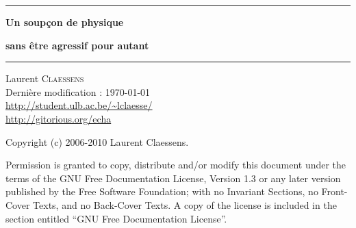 
\thispagestyle{empty}
\begin{center}
  \begin{minipage}{15cm}
    \hrule\par
    \vspace{2mm}
    \begin{center}
    \Huge \bfseries Un soupçon de physique  \par
    \Huge \bfseries sans être agressif pour autant \par
    \end{center}
    \hrule\par
  \end{minipage}
\end{center}

\vfill\vfill
\null\hfill Laurent \textsc{Claessens}\\
\null\hfill Dernière modification : \today\\
\null\hfill \url{http://student.ulb.ac.be/~lclaesse/}\\
\null\hfill \url{http://gitorious.org/echa}

\newpage

Copyright (c) 2006-2010  Laurent Claessens.

Permission is granted to copy, distribute and/or modify this document under the terms of the GNU Free Documentation License, Version 1.3 or any later version published by the Free Software Foundation; with no Invariant Sections, no Front-Cover Texts, and no Back-Cover Texts. A copy of the license is included in the section entitled ``GNU Free Documentation License''.


